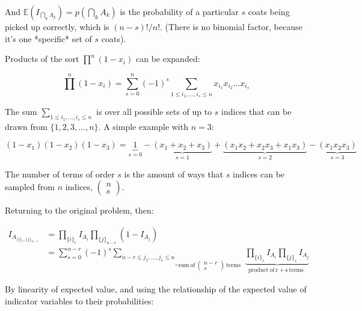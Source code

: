 And $\mathbb{E}(I_{\bigcap_{k} A_k}) = p(\bigcap_{k} A_k)$ is the probability of a particular $s$ coats being picked up correctly, which is $(n-s)!/n!$. (There is no binomial factor, because it's one *specific* set of $s$ coats).

Products of the sort $\prod^n (1-x_i)$ can be expanded:

\begin{equation}
\prod^n (1-x_i) = \sum_{s=0}^n (-1)^s \sum_{1\leq i_1,...,i_s\leq n} x_{i_1}x_{i_2}...x_{i_s}
\end{equation}

The sum $\sum_{1\leq i_1,...,i_s\leq n}$ is over all possible sets of up to $s$ indices that can be drawn from $\{1,2,3,...,n\}$. A simple example with $n=3$:

\begin{equation}
(1-x_1)(1-x_2)(1-x_3) = \underbrace{1}_{s=0} - \underbrace{(x_1 + x_2 + x_3)}_{s=1} + \underbrace{(x_1x_2 + x_2x_3 + x_1x_3)}_{s=2} - \underbrace{(x_1x_2x_3)}_{s=3}
\end{equation}

The number of terms of order $s$ is the amount of ways that $s$ indices can be sampled from $n$ indices, $\left(\begin{array}{l}n\\s\end{array}\right)$.

Returning to the original problem, then:

\begin{equation}
\begin{array}{ll}
I_{A_{\{i\}_r,\{j\}_{n-r}}} &= \prod_{\{i\}_r}I_{A_i}\prod_{\{j\}_{n-r}}(1-I_{A_j})\\
&=\sum_{s=0}^{n-r} (-1)^s \underbrace{\sum_{n-r\leq j_1,...,j_s\leq n}}_{\mathrm{sum\ of\ }\left(\begin{array}{l}n-r\\s\end{array}\right)\mathrm{\ terms\ \ }} \underbrace{\prod_{\{i\}_r} I_{A_i}\prod_{\{j\}_s}I_{A_j}}_{\mathrm{product\ of\ r+s\ terms\ \ }}
\end{array}
\end{equation}

By linearity of expected value, and using the relationship of the expected value of indicator variables to their probabilities:


